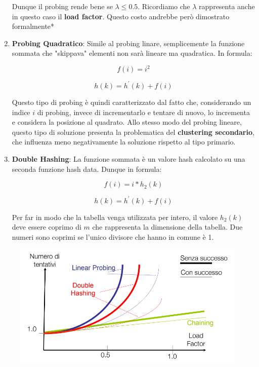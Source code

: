 \documentclass{article}
\begin{document}
\begin{enumerate}
Dunque il probing rende bene se $\lambda \leq 0.5$. Ricordiamo che $\lambda$ rappresenta anche in questo caso il \textbf{load factor}.
Questo costo andrebbe però dimostrato formalmente*

\newpage

    \item \textbf{Probing Quadratico}: Simile al probing linare, semplicemente la funzione sommata che "skippava" elementi non sarà lineare ma quadratica. In formula:

    \begin{equation}
        f(i)=i^{2}
    \end{equation}
    
    \begin{equation}
        h(k)=h^{'}(k)+f(i)
    \end{equation}

Questo tipo di probing è quindi caratterizzato dal fatto che, considerando un indice $i$ di probing, invece di incrementarlo e tentare di nuovo, lo incrementa e considera la posizione al quadrato. Allo stesso modo del probing lineare, questo tipo di soluzione presenta la problematica del \textbf{clustering secondario}, che influenza meno negativamente la soluzione rispetto al tipo primario.

\item \textbf{Double Hashing}: La funzione sommata è un valore hash calcolato su una seconda funzione hash data. Dunque in formula:

\begin{equation}
    f(i)=i*h_{2}(k)
\end{equation}

\begin{equation}
    h(k)=h^{'}(k)+f(i)
\end{equation}

Per far in modo che la tabella venga utilizzata per intero, il valore $h_{2}(k)$ deve essere coprimo di $m$ che rappresenta la dimensione della tabella.
Due numeri sono coprimi se l'unico divisore che hanno in comune è 1.
    
\end{enumerate}

\begin{figure}[htbp]
        \center
        \includegraphics[scale=0.35]{img/openAddressingImg1.png}
    \end{figure}
\end{document}

